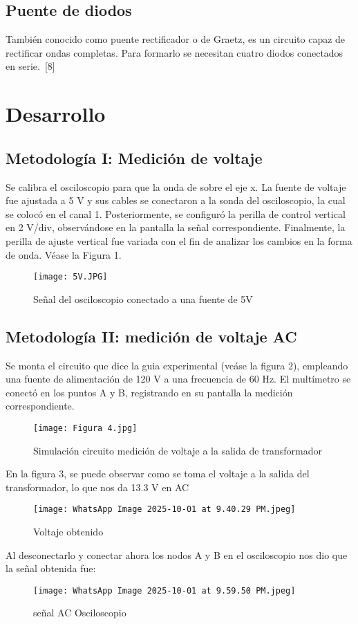 \documentclass[conference]{IEEEtran} %
\begin{document}
\subsection{Puente de diodos}
También conocido como puente rectificador o de Graetz, es un circuito capaz de rectificar ondas completas. Para formarlo se necesitan cuatro diodos conectados en serie.~[8]


\section{Desarrollo}
\subsection{Metodología I: Medición de voltaje}
Se calibra el osciloscopio para que la onda de sobre el eje x.
La fuente de voltaje fue ajustada a 5 V y sus cables se conectaron a la sonda del osciloscopio, la cual se colocó en el canal 1. Posteriormente, se configuró la perilla de control vertical en 2 V/div, observándose en la pantalla la señal correspondiente. Finalmente, la perilla de ajuste vertical fue variada con el fin de analizar los cambios en la forma de onda. Véase la Figura 1.
\begin{figure}[H]
    \centering
    \texttt{[image: 5V.JPG]}
    \caption{Señal del osciloscopio conectado a una fuente de 5V}
    \label{fig:placeholder}
\end{figure}

\subsection{Metodología II: medición de voltaje AC}
Se monta el circuito que dice la guia experimental (veáse la figura 2), empleando una fuente de alimentación de 120 V a una frecuencia de 60 Hz. El multímetro se conectó en los puntos A y B, registrando en su pantalla la medición correspondiente.

\begin{figure}[H]
    \centering
    \texttt{[image: Figura 4.jpg]}
    \caption{Simulación circuito medición de voltaje a la salida de transformador}
    \label{fig:placeholder}
\end{figure}
En la figura 3, se puede observar como se toma el voltaje a la salida del transformador, lo que nos da 13.3 V en AC 
\begin{figure}[H]
    \centering
    \texttt{[image: WhatsApp Image 2025-10-01 at 9.40.29 PM.jpeg]}
    \caption{Voltaje obtenido}
    \label{fig:placeholder}
\end{figure}
Al desconectarlo y conectar ahora los nodos A y B en el osciloscopio nos dio que la señal obtenida fue: 
\begin{figure}[H]
    \centering
    \texttt{[image: WhatsApp Image 2025-10-01 at 9.59.50 PM.jpeg]}
    \caption{señal AC Osciloscopio}
    \label{fig:placeholder}
\end{figure}
\end{document}
